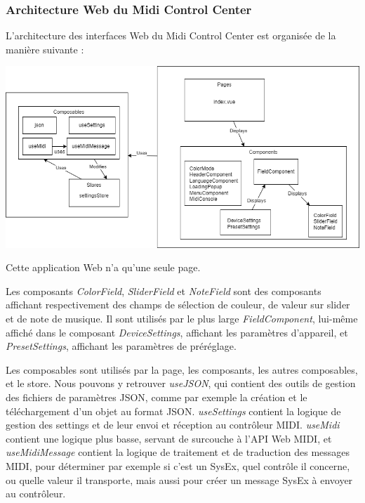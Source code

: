 \documentclass[francais]{rapportPFE}  %
\begin{document}
\subsubsection{Architecture Web du Midi Control Center}

L'architecture des interfaces Web du Midi Control Center est organisée de la manière suivante : 

\begin{center}
    \centering
    \includegraphics[width=15cm]{graphics/minilab3nuxt.png}
    \label{fig:test1}
\end{center}

Cette application Web n'a qu'une seule page.

Les composants \textit{ColorField}, \textit{SliderField} et \textit{NoteField} sont des composants affichant respectivement des champs de sélection de couleur, de valeur sur slider et de note de musique. Il sont utilisés par le plus large \textit{FieldComponent}, lui-même affiché dans le composant \textit{DeviceSettings}, affichant les paramètres d'appareil, et \textit{PresetSettings}, affichant les paramètres de préréglage.

Les composables sont utilisés par la page, les composants, les autres composables, et le store. Nous pouvons y retrouver \textit{useJSON}, qui contient des outils de gestion des fichiers de paramètres JSON, comme par exemple la création et le téléchargement d'un objet au format JSON. \textit{useSettings} contient la logique de gestion des settings et de leur envoi et réception au contrôleur MIDI. \textit{useMidi} contient une logique plus basse, servant de surcouche à l'API Web MIDI, et \textit{useMidiMessage} contient la logique de traitement et de traduction des messages MIDI, pour déterminer par exemple si c'est un SysEx, quel contrôle il concerne, ou quelle valeur il transporte, mais aussi pour créer un message SysEx à envoyer au contrôleur.
\end{document}
